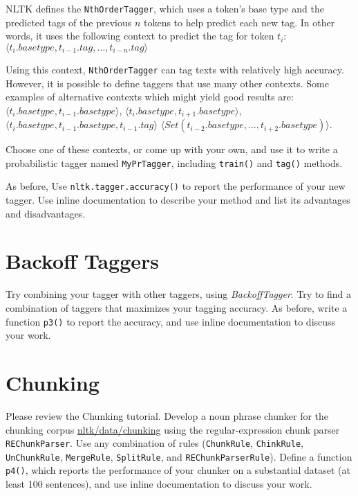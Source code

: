 \documentclass{460}
\begin{document}
NLTK defines the \texttt{NthOrderTagger}, which uses a token's base
type and the predicted tags of the previous $n$ tokens to help predict
each new tag.  In other words, it uses the following context to
predict the tag for token $t_i$:
$\langle t_i.basetype, t_{i-1}.tag, \ldots, t_{i-n}.tag\rangle$

Using this context, \texttt{NthOrderTagger} can tag texts with
relatively high accuracy.  However, it is possible to define taggers
that use many other contexts.  Some examples of alternative contexts
which might yield good results are:
$\langle t_i.basetype, t_{i-1}.basetype\rangle$,
$\langle t_i.basetype, t_{i+1}.basetype\rangle$,
$\langle t_i.basetype, t_{i-1}.basetype, t_{i-1}.tag\rangle$
$\langle Set(t_{i-2}.basetype, \ldots, t_{i+2}.basetype)\rangle$.

Choose one of these contexts, or come up with your own, and use it to
write a probabilistic tagger named \texttt{MyPrTagger}, including
\texttt{train()} and \texttt{tag()} methods.

As before, Use \texttt{nltk.tagger.accuracy()} to report the
performance of your new tagger.  Use inline documentation to describe
your method and list its advantages and disadvantages.

\section{Backoff Taggers}

Try combining your tagger with other taggers, using
\textit{BackoffTagger}.  Try to find a combination of taggers that
maximizes your tagging accuracy.  As before, write a function
\texttt{p3()} to report the accuracy, and use inline documentation to
discuss your work.

\section{Chunking}

Please review the Chunking tutorial.
Develop a noun phrase chunker for the chunking corpus
\url{nltk/data/chunking} using the regular-expression
chunk parser \texttt{REChunkParser}.  Use any
combination of rules (\texttt{ChunkRule}, \texttt{ChinkRule},
\texttt{UnChunkRule}, \texttt{MergeRule}, \texttt{SplitRule}, and
\texttt{REChunkParserRule}).
Define a function \texttt{p4()}, which reports the performance of
your chunker on a substantial dataset (at least 100 sentences),
and use inline documentation to discuss your work.
\end{document}
